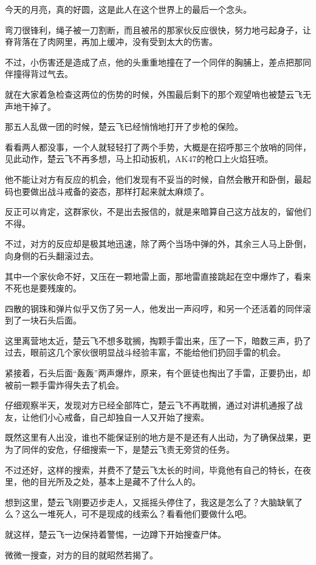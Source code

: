 今天的月亮，真的好圆，这是此人在这个世界上的最后一个念头。

弯刀很锋利，绳子被一刀割断，而且被吊的那家伙反应很快，努力地弓起身子，让脊背落在了肉网里，再加上缓冲，没有受到太大的伤害。

不过，小伤害还是造成了点，他的头重重地撞在了一个同伴的胸脯上，差点把那同伴撞得背过气去。

就在大家着急检查这两位的伤势的时候，外围最后剩下的那个观望哨也被楚云飞无声地干掉了。

那五人乱做一团的时候，楚云飞已经悄悄地打开了步枪的保险。

看看两人都没事，一个人就轻轻打了两个手势，大概是在招呼那三个放哨的同伴，见此动作，楚云飞不再多想，马上扣动扳机，AK47的枪口上火焰狂喷。

他不能让对方有反应的机会，他们发现有不妥当的时候，自然会散开和卧倒，最起码也要做出战斗戒备的姿态，那样打起来就太麻烦了。

反正可以肯定，这群家伙，不是出去报信的，就是来暗算自己这方战友的，留他们不得。

不过，对方的反应却是极其地迅速，除了两个当场中弹的外，其余三人马上卧倒，向身侧的石头翻滚过去。

其中一个家伙命不好，又压在一颗地雷上面，那地雷直接跳起在空中爆炸了，看来不死也是要残废的。

四散的钢珠和弹片似乎又伤了另一人，他发出一声闷哼，和另一个还活着的同伴滚到了一块石头后面。

这里离营地太近，楚云飞不想多耽搁，掏颗手雷出来，压了一下，暗数三声，扔了过去，眼前这几个家伙很明显战斗经验丰富，不能给他们扔回手雷的机会。

紧接着，石头后面“轰轰”两声爆炸，原来，有个匪徒也掏出了手雷，正要扔出，却被前一颗手雷炸得失去了机会。

仔细观察半天，发现对方已经全部阵亡，楚云飞不再耽搁，通过对讲机通报了战友，让他们小心戒备，自己却独自一人又开始了搜索。

既然这里有人出没，谁也不能保证别的地方是不是还有人出动，为了确保战果，更为了同伴的安危，仔细搜索一下，是楚云飞责无旁贷的任务。

不过还好，这样的搜索，并费不了楚云飞太长的时间，毕竟他有自己的特长，在夜里，他的目光所及之处，基本上是藏不了什么人的。

想到这里，楚云飞刚要迈步走人，又摇摇头停住了，我这是怎么了？大脑缺氧了么？这么一堆死人，可不是现成的线索么？看看他们要做什么吧。

就这样，楚云飞一边保持着警惕，一边蹲下开始搜查尸体。

微微一搜查，对方的目的就昭然若揭了。

